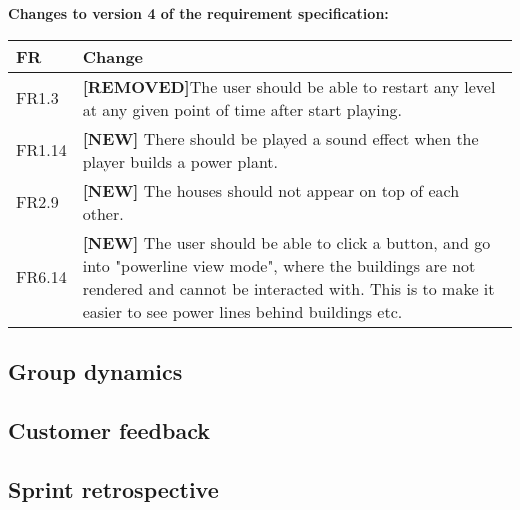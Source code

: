 	{\bf Changes to version 4 of the requirement specification:} \\
	\begin{tabular}{| p{1.5cm} | p{12cm} |}
		\hline
		\rowcolor{lightgray}
		{\bf FR} & {\bf Change} \\ \hline
		FR1.3 & {\bf \color{red}[REMOVED]}The user should be able to restart any level at any given point of time after start playing. \\ \hline
		FR1.14 & {\bf \color{green}[NEW]} There should be played a sound effect when the player builds a power plant. \\ \hline
		FR2.9 & {\bf \color{green}[NEW]} The houses should not appear on top of each other. \\ \hline
		FR6.14 & {\bf \color{green}[NEW]} The user should be able to click a button, and go into "powerline view mode", where the buildings are not rendered and cannot be interacted with. This is to make it easier to see power lines behind buildings etc. \\ \hline
	\end{tabular}

\subsection{Group dynamics}

\subsection{Customer feedback}

\subsection{Sprint retrospective}
